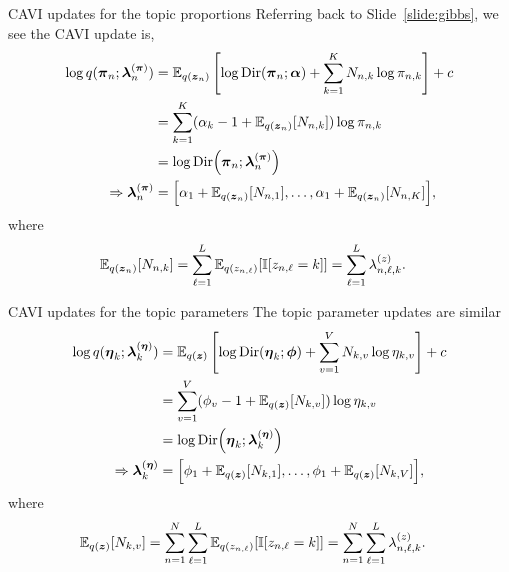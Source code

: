 \documentclass[aspectratio=169]{beamer}
\begin{document}
\begin{frame}{CAVI updates for the topic proportions}
Referring back to Slide~\ref{slide:gibbs}, we see the CAVI update is,
\begin{align}
    \log q(\boldsymbol{\pi}_{n}; \boldsymbol{\lambda}^{(\boldsymbol{\pi})}_{n}) &=
    \mathbb{E}_{q(\boldsymbol{z}_n)} \left[ \log \mathrm{Dir}(\boldsymbol{\pi}_n; \boldsymbol{\alpha}) + \sum_{k=1}^K N_{n,k} \log \pi_{n,k} \right] + c \\
    &= \sum_{k=1}^K (\alpha_k - 1 + \mathbb{E}_{q(\boldsymbol{z}_n)}[N_{n,k}]) \log \pi_{n,k} \\
    &= \log \mathrm{Dir}\Big(\boldsymbol{\pi}_n; \boldsymbol{\lambda}_n^{(\boldsymbol{\pi})} \Big) \\
    \Rightarrow \boldsymbol{\lambda}^{(\boldsymbol{\pi})}_n &= \Big[\alpha_1 + \mathbb{E}_{q(\boldsymbol{z}_n)}[N_{n,1}], \ldots, \alpha_1 + \mathbb{E}_{q(\boldsymbol{z}_n)}[N_{n,K}] \Big],
\end{align}
where
\begin{align}
    \mathbb{E}_{q(\boldsymbol{z}_n)}[N_{n,k}] 
    &= \sum_{\ell=1}^L \mathbb{E}_{q(z_{n,\ell})}[\mathbb{I}[z_{n,\ell}=k]]
    = \sum_{\ell=1}^L \lambda_{n,\ell,k}^{(z)}.
\end{align}
\end{frame}

\begin{frame}{CAVI updates for the topic parameters}
The topic parameter updates are similar
\begin{align}
    \log q(\boldsymbol{\eta}_k; \boldsymbol{\lambda}^{(\boldsymbol{\eta})}_k) &=
    \mathbb{E}_{q(\boldsymbol{z})} \left[ \log \mathrm{Dir}(\boldsymbol{\eta}_k; \boldsymbol{\phi}) + \sum_{v=1}^V N_{k,v} \log \eta_{k,v} \right] + c \\
    &= \sum_{v=1}^V (\phi_v - 1 + \mathbb{E}_{q(\boldsymbol{z})}[N_{k,v}]) \log \eta_{k,v} \\
    &= \log \mathrm{Dir}\Big(\boldsymbol{\eta}_k; \boldsymbol{\lambda}^{(\boldsymbol{\eta})}_k \Big) \\
    \Rightarrow \boldsymbol{\lambda}^{(\boldsymbol{\eta})}_k &= \Big[\phi_1 + \mathbb{E}_{q(\boldsymbol{z})}[N_{k,1}], \ldots, \phi_1 + \mathbb{E}_{q(\boldsymbol{z})}[N_{k,V}] \Big],
\end{align}
where
\begin{align}
    \mathbb{E}_{q(\boldsymbol{z})}[N_{k,v}] 
    &= \sum_{n=1}^N \sum_{\ell=1}^L \mathbb{E}_{q(z_{n,\ell})}[\mathbb{I}[z_{n,\ell}=k]]
    = \sum_{n=1}^N \sum_{\ell=1}^L \lambda_{n,\ell,k}^{(z)}.
\end{align}
\end{frame}
\end{document}
